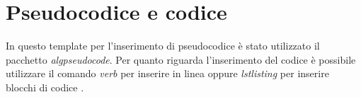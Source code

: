 \chapter{Pseudocodice e codice} 
\label{chapter:codice} 
In questo template per l'inserimento di pseudocodice è stato utilizzato il pacchetto \textit{algpseudocode}. Per quanto riguarda l'inserimento del codice è possibile utilizzare il comando \textit{verb} per inserire in linea oppure \textit{lstlisting} per inserire blocchi di codice \cite{einstein}. 



